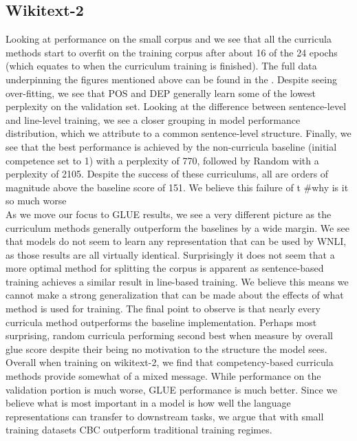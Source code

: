 \subsection{Wikitext-2}
Looking at performance on the small corpus  and  we see that all the curricula methods start to overfit on the training corpus after about 16 of the 24 epochs (which equates to when the curriculum training is finished). The full data underpinning the figures mentioned above can be found in the . Despite seeing over-fitting, we see that POS and DEP generally learn some of the lowest perplexity on the validation set. Looking at the difference between sentence-level and line-level training, we see a closer grouping in model performance distribution, which we attribute to a common sentence-level structure. Finally, we see that the best performance is achieved by the non-curricula baseline (initial competence set to 1) with a perplexity of 770, followed by Random with a perplexity of 2105. Despite the success of these curriculums, all are orders of magnitude above the baseline score of 151. We believe this failure of t #why is it so much worse\\
As we move our focus to GLUE results, we see a very different picture as the curriculum methods generally outperform the baselines by a wide margin. We see that models do not seem to learn any representation that can be used by WNLI, as those results are all virtually identical. Surprisingly it does not seem that a more optimal method for splitting the corpus is apparent as sentence-based training achieves a similar result in line-based training. We believe this means we cannot make a strong generalization that can be made about the effects of what method is used for training. The final point to observe is that nearly every curricula method outperforms the baseline implementation. Perhaps most surprising, random curricula performing second best when measure by overall glue score despite their being no motivation to the structure the model sees. \\
Overall when training on wikitext-2, we find that competency-based curricula methods provide somewhat of a mixed message. While performance on the validation portion is much worse, GLUE performance is much better. Since we believe what is most important in a model is how well the language representations can transfer to downstream tasks, we argue that with small training datasets CBC outperform traditional training regimes.

